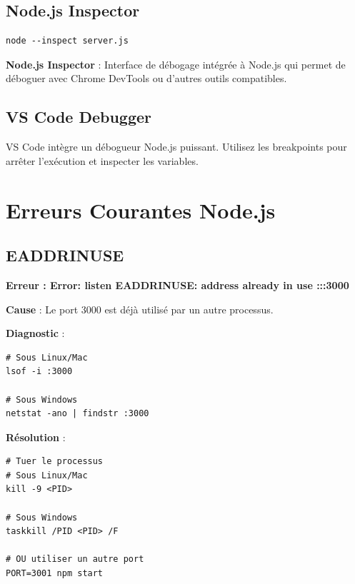\subsection{Node.js Inspector}

\begin{lstlisting}[style=bash, caption=Débogage avec Node.js Inspector]
node --inspect server.js
\end{lstlisting}

\begin{definitionbox}
    \textbf{Node.js Inspector} : Interface de débogage intégrée à Node.js qui permet de déboguer avec Chrome DevTools ou d'autres outils compatibles.
\end{definitionbox}

\subsection{VS Code Debugger}

VS Code intègre un débogueur Node.js puissant. Utilisez les breakpoints pour arrêter l'exécution et inspecter les variables.

\section{Erreurs Courantes Node.js}

\subsection{EADDRINUSE}

\begin{errorbox}
    \textbf{Erreur : Error: listen EADDRINUSE: address already in use :::3000}
    
    \textbf{Cause} : Le port 3000 est déjà utilisé par un autre processus.
    
    \textbf{Diagnostic} :
    \begin{lstlisting}[style=bash]
# Sous Linux/Mac
lsof -i :3000

# Sous Windows
netstat -ano | findstr :3000
    \end{lstlisting}
    
    \textbf{Résolution} :
    \begin{lstlisting}[style=bash]
# Tuer le processus
# Sous Linux/Mac
kill -9 <PID>

# Sous Windows
taskkill /PID <PID> /F

# OU utiliser un autre port
PORT=3001 npm start
    \end{lstlisting}
\end{errorbox}

